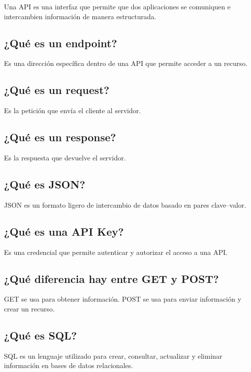 \documentclass[12pt]{article}
\begin{document}
Una API es una interfaz que permite que dos aplicaciones se comuniquen e intercambien información de manera estructurada.

\subsection{¿Qué es un endpoint?}

Es una dirección específica dentro de una API que permite acceder a un recurso.

\subsection{¿Qué es un request?}

Es la petición que envía el cliente al servidor.

\subsection{¿Qué es un response?}

Es la respuesta que devuelve el servidor.

\subsection{¿Qué es JSON?}

JSON es un formato ligero de intercambio de datos basado en pares clave--valor.

\subsection{¿Qué es una API Key?}

Es una credencial que permite autenticar y autorizar el acceso a una API.

\subsection{¿Qué diferencia hay entre GET y POST?}

GET se usa para obtener información. POST se usa para enviar información y crear un recurso.

\subsection{¿Qué es SQL?}

SQL es un lenguaje utilizado para crear, consultar, actualizar y eliminar información en bases de datos relacionales.
\end{document}
